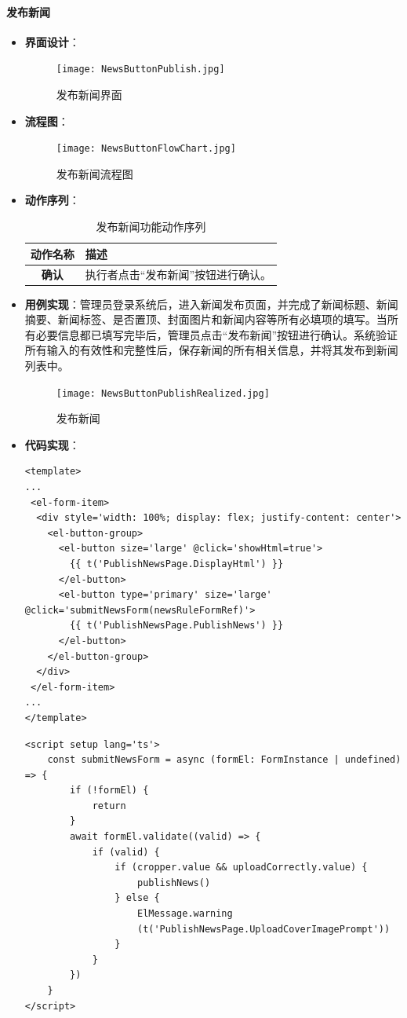 \paragraph{发布新闻}
\begin{itemize}
	\item \textbf{界面设计}：
	\begin{figure}[H]
		\centering
		\texttt{[image: NewsButtonPublish.jpg]}
		\caption{发布新闻界面}
		\label{NewsButtonPublish}
	\end{figure}
	\item \textbf{流程图}：
	\begin{figure}[H]
		\centering
		\texttt{[image: NewsButtonFlowChart.jpg]}
		\caption{发布新闻流程图}
		\label{NewsButtonFlowChart}
	\end{figure}
	\item \textbf{动作序列}：
	\begin{table}[H]
		\centering
		\caption{发布新闻功能动作序列}
		\renewcommand\arraystretch{1.5}
		\begin{tabular}{|c|>{\raggedright\arraybackslash}p{10cm}|}
			\hline
			\textbf{动作名称} & \textbf{描述} \\ \hline
			\textbf{确认} & 执行者点击“发布新闻”按钮进行确认。 \\ \hline
		\end{tabular}
	\end{table}
	\item \textbf{用例实现}：管理员登录系统后，进入新闻发布页面，并完成了新闻标题、新闻摘要、新闻标签、是否置顶、封面图片和新闻内容等所有必填项的填写。当所有必要信息都已填写完毕后，管理员点击“发布新闻”按钮进行确认。系统验证所有输入的有效性和完整性后，保存新闻的所有相关信息，并将其发布到新闻列表中。
	\begin{figure}[H]
		\centering
		\texttt{[image: NewsButtonPublishRealized.jpg]}
		\caption{发布新闻}
		\label{NewsButtonPublishRealized}
	\end{figure}
	\item \textbf{代码实现}：
	\begin{verbatim}
<template>
...
 <el-form-item>
  <div style='width: 100%; display: flex; justify-content: center'>
    <el-button-group>
      <el-button size='large' @click='showHtml=true'>
        {{ t('PublishNewsPage.DisplayHtml') }}
      </el-button>
      <el-button type='primary' size='large' @click='submitNewsForm(newsRuleFormRef)'>
        {{ t('PublishNewsPage.PublishNews') }}
      </el-button>
    </el-button-group>
  </div>
 </el-form-item>
...
</template>
	\end{verbatim}
	
	\begin{verbatim}
<script setup lang='ts'>
	const submitNewsForm = async (formEl: FormInstance | undefined) => {
		if (!formEl) {
			return
		}
		await formEl.validate((valid) => {
			if (valid) {
				if (cropper.value && uploadCorrectly.value) {
					publishNews()
				} else {
					ElMessage.warning
					(t('PublishNewsPage.UploadCoverImagePrompt'))
				}
			}
		})
	}
</script>
	\end{verbatim}
\end{itemize}

